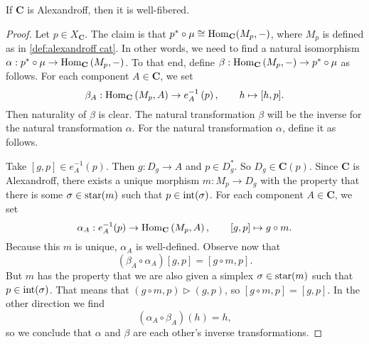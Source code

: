 \begin{lemma}
\label{lem:alexandroff implies well-fibered}
If $\mathbf{C}$ is Alexandroff, then it is well-fibered.
\end{lemma}
\begin{proof}
Let $p \in X_{\mathbf{C}}$. The claim is that $p^* \circ \operatorname{\mu} \cong \operatorname{Hom}_{\mathbf{C}}(M_p,-)$, where $M_p$ is defined as in \cref{def:alexandroff cat}. In other words, we need to find a natural isomorphism $\alpha : p^* \circ \operatorname{\mu} \to \operatorname{Hom}_{\mathbf{C}}\left(M_p,-\right)$. To that end, define $\beta : \operatorname{Hom}_{\mathbf{C}}\left( M_p, - \right) \to p^* \circ \operatorname{\mu}$ as follows. For each component $A \in \mathbf{C}$, we set 
\[ \beta_A : \operatorname{Hom}_{\mathbf{C}}\left(M_p,A \right) \to e^{-1}_A\left(p \right), \qquad h \mapsto [h,p]. \]
Then naturality of $\beta$ is clear. The natural transformation $\beta$ will be the inverse for the natural transformation $\alpha$. For the natural transformation $\alpha$, define it as follows.

Take $[g,p] \in e^{-1}_A(p)$. 
Then $g : D_g \to A$ and $p \in D_g^*$. 
So $D_g \in \mathbf{C}(p)$. Since $\mathbf{C}$ is Alexandroff, there exists a unique morphism $m : M_p \to D_g$ with the property that there is some $\sigma \in \operatorname{star}(m)$ such that $p \in \operatorname{int}(\sigma)$. For each component $A \in \mathbf{C}$, we set
\[ \alpha_A : e^{-1}_A(p) \to \operatorname{Hom}_{\mathbf{C}}\left(M_p, A \right), \qquad [g,p] \mapsto g \circ m. \]
Because this $m$ is unique, $\alpha_A$ is well-defined. Observe now that
\[ \left(\beta_A \circ \alpha_A\right)[g,p] = [g \circ m, p]. \]
But $m$ has the property that we are also given a simplex $\sigma \in \operatorname{star}(m)$ such that $p \in \operatorname{int}(\sigma)$. That means that $(g \circ m,p) \rhd (g,p)$, so $[g \circ m,p] = [g,p]$. In the other direction we find
\[ \left(\alpha_A \circ \beta_A \right)(h) = h, \]
so we conclude that $\alpha$ and $\beta$ are each other's inverse transformations.
\end{proof}

